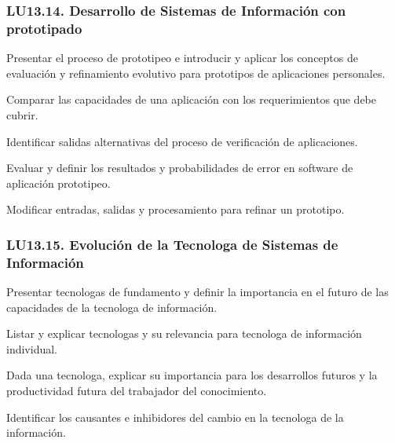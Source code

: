 \subsubsection{LU13.14. Desarrollo de Sistemas de Información con prototipado}\label{sec:LU13.14}
\begin{LearningUnit}
\begin{LUGoal}
\item Presentar el proceso de prototipeo e introducir y aplicar los conceptos de evaluación y refinamiento evolutivo para prototipos de aplicaciones personales.
\end{LUGoal}

\begin{LUObjective}
\item Comparar las capacidades de una aplicación con los requerimientos que debe cubrir.
\item Identificar salidas alternativas del proceso de verificación de aplicaciones.
\item Evaluar y definir los resultados y probabilidades de error en software de aplicación prototipeo.
\item Modificar entradas, salidas y procesamiento para refinar un prototipo.
\end{LUObjective}
\end{LearningUnit}

\subsubsection{LU13.15. Evolución de la Tecnolog­a de Sistemas de Información}\label{sec:LU13.15}
\begin{LearningUnit}
\begin{LUGoal}
\item Presentar tecnolog­as de fundamento y definir la importancia en el futuro de las capacidades de la tecnolog­a de información.
\end{LUGoal}

\begin{LUObjective}
\item Listar y explicar tecnolog­as y su relevancia para tecnolog­a de información individual.
\item Dada una tecnolog­a, explicar su importancia para los desarrollos futuros y la productividad futura del trabajador del conocimiento.
\item Identificar los causantes e inhibidores del cambio en la tecnolog­a de la información.
\end{LUObjective}
\end{LearningUnit}

